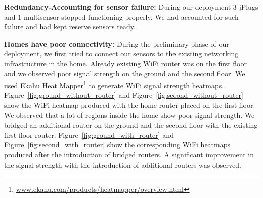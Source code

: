 \documentclass[10pt]{sensys-proc}
\newcommand{\figref}[1]{Figure~\ref{#1}}
\begin{document}
\noindent \textbf{Redundancy-Accounting for sensor failure:} During our deployment 3 jPlugs and 1 multisensor stopped functioning properly. We had accounted for such failure and had kept reserve sensors ready. %

\noindent \textbf{Homes have poor connectivity:} During the preliminary phase of our deployment, we first tried to connect our sensors to the existing networking infrastructure in the home. Already existing WiFi router was on the first floor and we observed poor signal strength on the ground and the second floor. We used Ekahu Heat Mapper\footnote{\url{www.ekahu.com/products/heatmapper/overview.html}} to generate WiFi signal strength heatmaps. \figref{fig:ground_without_router} and \figref{fig:second_without_router} show the WiFi heatmap produced with the home router placed on the first floor. We observed that a lot of regions inside the home show poor signal strength. We bridged an additional router on the ground and the second floor with the existing first floor router. \figref{fig:ground_with_router} and \figref{fig:second_with_router} show the corresponding WiFi heatmaps produced after the introduction of bridged routers. A significant improvement in the signal strength with the introduction of additional routers was observed. 

\end{document}
